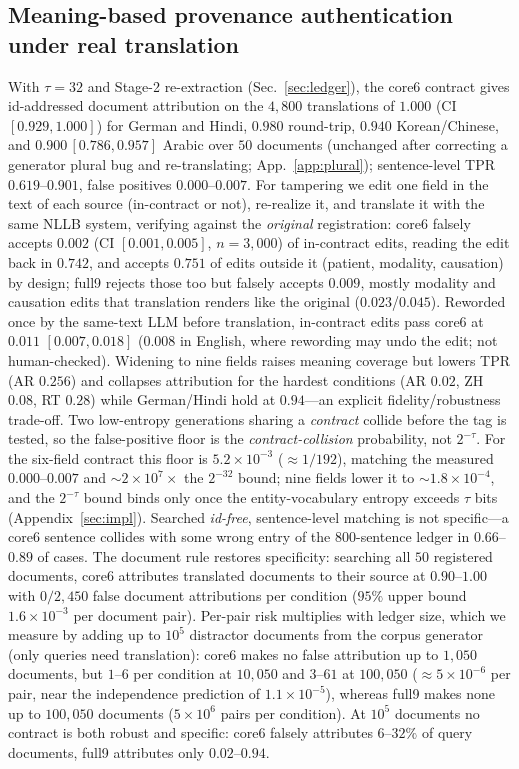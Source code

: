 \documentclass[11pt]{article}
\begin{document}
\subsection{Meaning-based provenance authentication under real translation}
\label{sec:provenance}
With $\tau{=}32$ and Stage-2 re-extraction (Sec.~\ref{sec:ledger}), the core6 contract gives id-addressed document attribution on the $4{,}800$ translations of $1.000$ (CI $[0.929,1.000]$) for German and Hindi, $0.980$ round-trip, $0.940$ Korean/Chinese, and $0.900\,[0.786,0.957]$ Arabic over $50$ documents (unchanged after correcting a generator plural bug and re-translating; App.~\ref{app:plural}); sentence-level TPR $0.619$--$0.901$, false positives $0.000$--$0.007$. For tampering we edit one field in the text of each source (in-contract or not), re-realize it, and translate it with the same NLLB system, verifying against the \emph{original} registration: core6 falsely accepts $0.002$ (CI $[0.001,0.005]$, $n{=}3{,}000$) of in-contract edits, reading the edit back in $0.742$, and accepts $0.751$ of edits outside it (patient, modality, causation) by design; full9 rejects those too but falsely accepts $0.009$, mostly modality and causation edits that translation renders like the original ($0.023$/$0.045$). Reworded once by the same-text LLM before translation, in-contract edits pass core6 at $0.011$ $[0.007,0.018]$ ($0.008$ in English, where rewording may undo the edit; not human-checked). Widening to nine fields raises meaning coverage but lowers TPR (AR $0.256$) and collapses attribution for the hardest conditions (AR $0.02$, ZH $0.08$, RT $0.28$) while German/Hindi hold at $0.94$---an explicit fidelity/robustness trade-off. Two low-entropy generations sharing a \emph{contract} collide before the tag is tested, so the false-positive floor is the \emph{contract-collision} probability, not $2^{-\tau}$. For the six-field contract this floor is $5.2\times10^{-3}$ ($\approx1/192$), matching the measured $0.000$--$0.007$ and $\sim\!2\times10^{7}\times$ the $2^{-32}$ bound; nine fields lower it to $\sim\!1.8\times10^{-4}$, and the $2^{-\tau}$ bound binds only once the entity-vocabulary entropy exceeds $\tau$ bits (Appendix~\ref{sec:impl}). Searched \emph{id-free}, sentence-level matching is not specific---a core6 sentence collides with some wrong entry of the $800$-sentence ledger in $0.66$--$0.89$ of cases. The document rule restores specificity: searching all $50$ registered documents, core6 attributes translated documents to their source at $0.90$--$1.00$ with $0/2{,}450$ false document attributions per condition ($95\%$ upper bound $1.6\times10^{-3}$ per document pair). Per-pair risk multiplies with ledger size, which we measure by adding up to $10^5$ distractor documents from the corpus generator (only queries need translation): core6 makes no false attribution up to $1{,}050$ documents, but $1$--$6$ per condition at $10{,}050$ and $3$--$61$ at $100{,}050$ ($\approx5\times10^{-6}$ per pair, near the independence prediction of $1.1\times10^{-5}$), whereas full9 makes none up to $100{,}050$ documents ($5\times10^{6}$ pairs per condition). At $10^5$ documents no contract is both robust and specific: core6 falsely attributes $6$--$32\%$ of query documents, full9 attributes only $0.02$--$0.94$.
\end{document}
